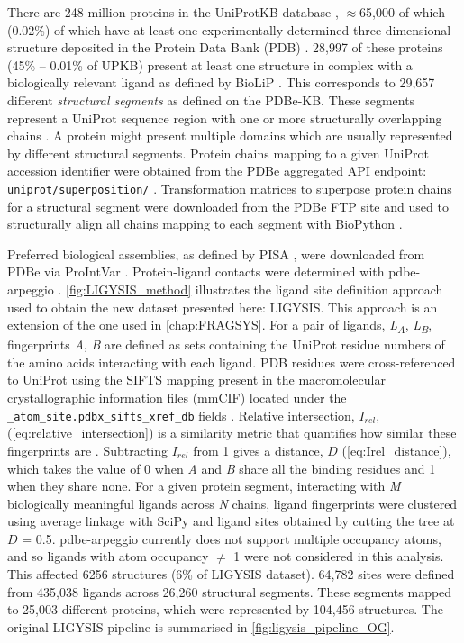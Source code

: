 There are 248 million proteins in the UniProtKB database \cite{UNIPROT_2020_UNIPROT}, $\approx$65,000 of which (0.02\%) of which have at least one experimentally determined three-dimensional structure deposited in the Protein Data Bank (PDB) \cite{ARMSTRONG_2020_PDBE}. 28,997 of these proteins (45\% -- 0.01\% of UPKB) present at least one structure in complex with a biologically relevant ligand as defined by BioLiP \cite{YANG_2013_BIOLIP}. This corresponds to 29,657 different \textit{structural segments} as defined on the PDBe-KB. These segments represent a UniProt sequence region with one or more structurally overlapping chains  \cite{ELLAWAY_2024_CONFORMATIONS}. A protein might present multiple domains which are usually represented by different structural segments. Protein chains mapping to a given UniProt accession identifier were obtained from the PDBe aggregated API endpoint: \texttt{uniprot/superposition/} \cite{SUPP_ENDPOINT, PDBEKB_2019_PDBEKB}. Transformation matrices to superpose protein chains for a structural segment were downloaded from the PDBe FTP site \cite{SUPP_FTP_ENDPOINT, PDBE_2022_PDBEKB} and used to structurally align all chains mapping to each segment with BioPython \cite{COCK_2009_BIOPYTHON}.

Preferred biological assemblies, as defined by PISA \cite{KRISSINEL_2007_PISA}, were downloaded from PDBe via ProIntVar \cite{MACGOWAN_2020_DRSASP}. Protein-ligand contacts were determined with pdbe-arpeggio \cite{JUBB_2017_ARPEGGIO}. \autoref{fig:LIGYSIS_method} illustrates the ligand site definition approach used to obtain the new dataset presented here: LIGYSIS. This approach is an extension of the one used in \autoref{chap:FRAGSYS}. For a pair of ligands, \textit{L\textsubscript{A}}, \textit{L\textsubscript{B}}, fingerprints \textit{A}, \textit{B} are defined as sets containing the UniProt residue numbers of the amino acids interacting with each ligand. PDB residues were cross-referenced to UniProt using the SIFTS mapping present in the macromolecular crystallographic information files (mmCIF) located under the \texttt{\_atom\_site.pdbx\_si\discretionary{-}{}{}fts\_xref\_db} fields \cite{VELANKAR_2012_SIFTS, DANA_2018_SIFTS}. Relative intersection, $I_{rel}$, (\autoref{eq:relative_intersection}) is a similarity metric that quantifies how similar these fingerprints are \cite{UTGES_2024_FRAGSYS}. Subtracting $I_{rel}$ from 1 gives a distance, $D$ (\autoref{eq:Irel_distance}), which takes the value of 0 when \textit{A} and \textit{B} share all the binding residues and 1 when they share none. For a given protein segment, interacting with \textit{M} biologically meaningful ligands across \textit{N} chains, ligand fingerprints were clustered using average linkage with SciPy \cite{VIRTANEN_2020_SCIPY} and ligand sites obtained by cutting the tree at $D$ = 0.5. pdbe-arpeggio currently does not support multiple occupancy atoms, and so ligands with atom occupancy $\neq$ 1 were not considered in this analysis. This affected 6256 structures (6\% of LIGYSIS dataset). 64,782 sites were defined from 435,038 ligands across 26,260 structural segments. These segments mapped to 25,003 different proteins, which were represented by 104,456 structures. The original LIGYSIS pipeline is summarised in \autoref{fig:ligysis_pipeline_OG}.

